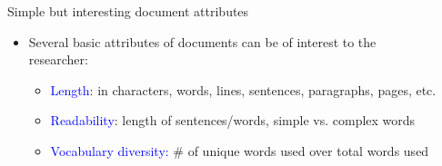\documentclass[english]{beamer}
\begin{document}
%

\begin{frame}{Simple but interesting document attributes}

\begin{itemize}
\setlength{\itemsep}{1em}
\setlength{\itemindent}{-0.5em}
\item Several basic attributes of documents can be of interest to the\\
\hspace{-5pt}researcher:
\vspace{12pt}
\begin{itemize}
\setlength{\itemsep}{1.5em}
\setlength{\itemindent}{-1em}
\item \textcolor{blue}{Length}: in characters, words, lines, sentences, paragraphs, pages, etc.
\item \textcolor{blue}{Readability}: length of sentences/words, simple vs. complex words
\item \textcolor{blue}{Vocabulary diversity:} \# of unique words used over total words used
\end{itemize}
\end{itemize}
\end{frame}
\end{document}
